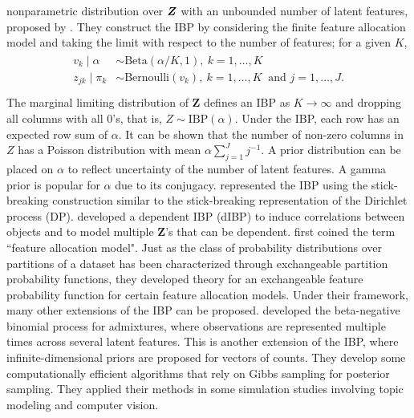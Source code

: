 \documentclass[12pt,]{article}
\def\Z{\bm{Z}}
\newcommand{\bZ}{\mbox{\boldmath $Z$}}
\begin{document}
nonparametric distribution over $\bZ$ with an unbounded number of latent
features, proposed by \citet{griffiths2011indian}. 
They construct the IBP by considering the finite feature allocation
model and taking the limit with respect to the number of features; for a given
$K$,
\begin{align}
\begin{split}
v_k \mid \alpha &\sim \text{Beta}(\alpha/K, 1),~ k=1, \ldots, K \\
z_{jk} \mid \pi_k &\sim \text{Bernoulli}(v_k),~ k=1, \ldots, K~\mbox{ and } j=1, \ldots, J. \\
\end{split}
\label{eq:ibp}
\end{align}
The marginal limiting distribution of $\Z$ defines an IBP as $K \rightarrow
\infty$ and dropping all columns with all 0's, that is,  \(Z \sim
\text{IBP}(\alpha)\).
Under the IBP, each row has an expected row sum of $\alpha$.
% 
%
It can be shown that the number of non-zero columns in $Z$ has a Poisson
distribution with mean $\alpha \sum_{j=1}^J j^{-1}$. A prior
distribution can be placed on \(\alpha\) to reflect uncertainty of the number
of latent features. A gamma prior is popular for $\alpha$ due to its conjugacy.
\cite{teh2007stick} represented the IBP using the stick-breaking construction
similar to the stick-breaking representation of the Dirichlet process (DP).
\cite{williamson2010dependent} developed a dependent IBP (dIBP) to induce
correlations between objects and to model multiple $\Z$'s that can be dependent.
\cite{broderick2015combinatorial} first coined the term ``feature allocation
model". Just as the class of probability distributions over partitions of a
dataset has been characterized through exchangeable partition probability
functions, they developed theory for an exchangeable feature probability
function for certain feature allocation models. Under their framework,
many other extensions of the IBP can be proposed. \cite{broderick2013feature} developed the beta-negative binomial process for
admixtures, where observations are represented multiple times across several
latent features. This is another extension of the IBP, where
infinite-dimensional priors are proposed for vectors of counts. They develop
some computationally efficient algorithms that rely on Gibbs sampling for 
posterior sampling. They applied their methods in some simulation studies 
involving topic modeling and computer vision.
\end{document}
